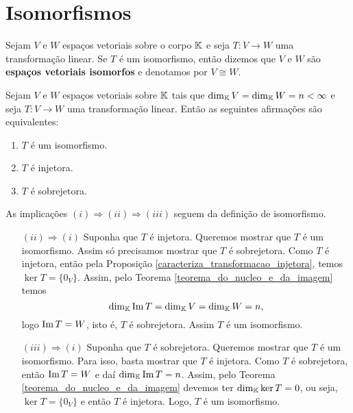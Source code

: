 \section{Isomorfismos}

\begin{definicao}
	Sejam $V$ e $W$ espaços vetoriais sobre o corpo $\mathbb{K}$ e seja $T : V \to W$ uma transformação linear. Se $T$ é um isomorfismo, então dizemos que $V$ e $W$ são \textbf{espaços vetoriais isomorfos} e denotamos por $V \cong W$.
\end{definicao}

\begin{proposicao}\label{equivalencia_isomorfismo_dimensao_finita}
	Sejam $V$ e $W$ espaços vetoriais sobre $\mathbb{K}$ tais que $\dim_{\mathbb{K}}V = \dim_{\mathbb{K}}W = n < \infty$ e seja $T : V \to W$ uma transformação linear. Então as seguintes afirmações são equivalentes:
	\begin{enumerate}
		\item $T$ é um isomorfismo.
		\item $T$ é injetora.
		\item $T$ é sobrejetora.
	\end{enumerate}
\end{proposicao}
\begin{prova}
	As implicações $(i) \Rightarrow (ii) \Rightarrow (iii)$ seguem da definição de isomorfismo.
	\begin{enumerate}
		\item[$(ii) \Rightarrow (i)$] Suponha que $T$ é injetora. Queremos mostrar que $T$ é um isomorfismo. Assim só precisamos mostrar que $T$ é sobrejetora. Como $T$ é injetora, então pela Proposição \ref{caracteriza_transformacao_injetora}, temos $\ker T = \{0_V\}$. Assim, pelo Teorema \ref{teorema_do_nucleo_e_da_imagem} temos
		\[
			\dim_{\mathbb{K}}{\rm Im\,} T = \dim_{\mathbb{K}}V = \dim_{\mathbb{K}}W = n,
		\]
		logo ${\rm Im\,} T = W$, isto é, $T$ é sobrejetora. Assim $T$ é um isomorfismo.

		\item[$(iii) \Rightarrow (i)$] Suponha que $T$ é sobrejetora. Queremos mostrar que $T$ é um isomorfismo. Para isso, basta mostrar que $T$ é injetora. Como $T$ é sobrejetora, então ${\rm Im\,} T = W$ e daí $\dim_{\mathbb{K}}{\rm Im\,} T = n$. Assim, pelo Teorema \ref{teorema_do_nucleo_e_da_imagem} devemos ter $\dim_{\mathbb{K}}\ker T = 0$, ou seja, $\ker T = \{0_V\}$ e então $T$ é injetora. Logo, $T$ é um isomorfismo.
	\end{enumerate}
\end{prova}

